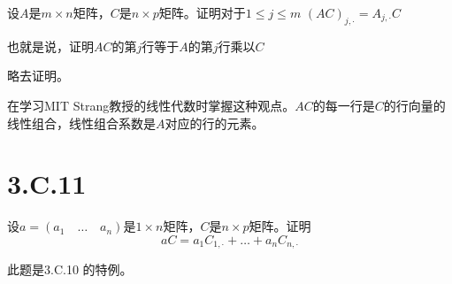 \documentclass[10pt,a4paper,UTF8]{article}
\begin{document}
\begin{problem}
设\(A\)是\(m\times n\)矩阵，\(C\)是\(n\times p\)矩阵。证明对于\(1\leq j \leq m\) \((AC)_{j,\cdot} = A_{j,\cdot}C\)

也就是说，证明\(AC\)的第\(j\)行等于\(A\)的第\(j\)行乘以\(C\)
\end{problem}

\begin{answer}
略去证明。

在学习MIT Strang教授的线性代数时掌握这种观点。\(AC\)的每一行是\(C\)的行向量的线性组合，线性组合系数是\(A\)对应的行的元素。
\end{answer}

\section{3.C.11}
\label{sec:org9664662}


\begin{problem}
设\(a=(a_{1} \quad \ldots \quad a_{n})\)是\(1\times n\)矩阵，\(C\)是\(n\times p\)矩阵。证明\[aC = a_{1}C_{1,\cdot} + \ldots + a_{n}C_{n,\cdot}\]
\end{problem}

\begin{answer}
此题是3.C.10 的特例。
\end{answer}
\end{document}
